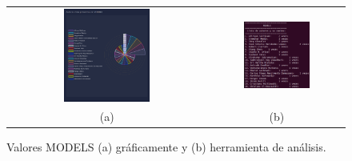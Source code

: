 \documentclass[a4paper, 12pt]{book}
\begin{document}
\begin{figure}[!h]
    \centering
    \begin{tabular}{cc}
    \includegraphics[width=0.45\textwidth]{img/models_all_graph.png} &  
    \includegraphics[width=0.52\textwidth]{img/models_all.png} \\ 
    (a) &(b) 
    \end{tabular}
    \caption{Valores MODELS (a) gráficamente y (b) herramienta de análisis.}
    \label{fig:comp_models_all}
\end{figure}
\end{document}
